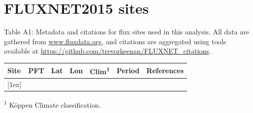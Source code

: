 \documentclass[12pt]{article}
\begin{document}


\section{FLUXNET2015 sites}
  Table A1: Metadata and citations for flux sites used in this analysis. All data are gathered from \url{www.fluxdata.org}, and citations are aggregated using tools available at \url{https://github.com/trevorkeenan/FLUXNET_citations}.
  \begin{longtable}{l l l l l l l}
    \hline
    \textbf{Site} &
    \textbf{PFT} &
    \textbf{Lat} &
    \textbf{Lon} &
    \textbf{Clim\textsuperscript{1}} &
    \textbf{Period} &
    \textbf{References} \\
    [0.5ex]
    \hline
    
    [1ex]
    \hline
  \end{longtable}
\textsuperscript{1} K{\"o}ppen Climate classification.


\end{document}
